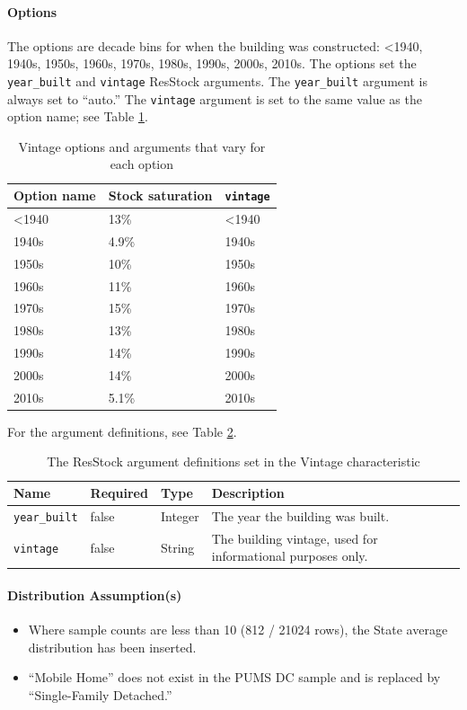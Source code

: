\paragraph{Options}
The options are decade bins for when the building was constructed: <1940, 1940s, 1950s, 1960s, 1970s, 1980s, 1990s, 2000s, 2010s. The options set the \texttt{year\_built} and \texttt{vintage} ResStock arguments. The \texttt{year\_built} argument is always set to ``auto.'' The \texttt{vintage} argument is set to the same value as the option name; see Table \ref{table:hc_opt_vintage}.

\begin{longtable}[]{ |p{}|p{3cm}|p{3cm}| }
\caption{Vintage options and arguments that vary for each option} \label{table:hc_opt_vintage} \\
\toprule\noalign{}
Option name & Stock saturation &
\texttt{vintage} \\
\midrule\noalign{}
\endhead
\bottomrule\noalign{}
\endlastfoot
\textless1940 & 13\% & \textless1940 \\
1940s & 4.9\% & 1940s \\
1950s & 10\% & 1950s \\
1960s & 11\% & 1960s \\
1970s & 15\% & 1970s \\
1980s & 13\% & 1980s \\
1990s & 14\% & 1990s \\
2000s & 14\% & 2000s \\
2010s & 5.1\% & 2010s \\
\end{longtable}

For the argument definitions, see Table \ref{table:hc_arg_def_vintage}.

\begin{longtable}[]{ |p{}|p{1.5cm}|p{1.1cm}|p{6cm}| }
\caption{The ResStock argument definitions set in the Vintage characteristic} \label{table:hc_arg_def_vintage}  \\
\toprule\noalign{}
Name & Required & Type & Description \\
\midrule\noalign{}
\endhead
\bottomrule\noalign{}
\endlastfoot
\texttt{year\_built} & false & Integer & The year the building was
built. \\
\hline
\texttt{vintage} & false & String & The building vintage, used for
informational purposes only. \\
\end{longtable}

\paragraph{Distribution Assumption(s)}
\begin{itemize}
    \item Where sample counts are less than 10 (812 / 21024 rows), the State average distribution has been inserted. 
    \item ``Mobile Home'' does not exist in the PUMS DC sample and is replaced by ``Single-Family Detached.''
\end{itemize}

